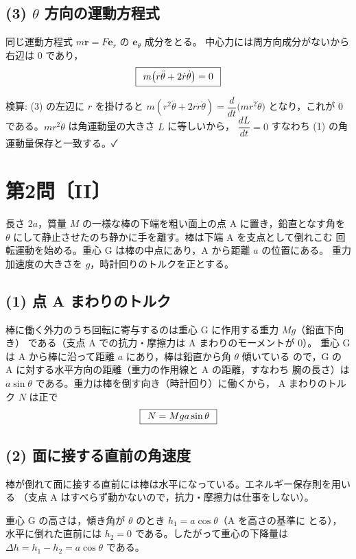 \documentclass[11pt,a4paper]{article}
\begin{document}
\subsection*{(3) $\theta$ 方向の運動方程式}
同じ運動方程式 $m\ddot{\bm{r}}=F\bm{e}_r$ の $\bm{e}_\theta$ 成分をとる。
中心力には周方向成分がないから右辺は $0$ であり，
\[
  \boxed{\,\;m\bigl(r\ddot\theta + 2\dot r\dot\theta\bigr)=0\;\,}
\]

\medskip
検算: (3) の左辺に $r$ を掛けると
$m(r^2\ddot\theta+2r\dot r\dot\theta)=\dfrac{d}{dt}\bigl(mr^2\dot\theta\bigr)$
となり，これが $0$ である。$mr^2\dot\theta$ は角運動量の大きさ $L$ に等しいから，
$\dfrac{dL}{dt}=0$ すなわち (1) の角運動量保存と一致する。✓

\clearpage
\section*{第2問〔II〕}

長さ $2a$，質量 $M$ の一様な棒の下端を粗い面上の点 A に置き，鉛直となす角を
$\theta$ にして静止させたのち静かに手を離す。棒は下端 A を支点として倒れこむ
回転運動を始める。重心 G は棒の中点にあり，A から距離 $a$ の位置にある。
重力加速度の大きさを $g$，時計回りのトルクを正とする。

\subsection*{(1) 点 A まわりのトルク}
棒に働く外力のうち回転に寄与するのは重心 G に作用する重力 $Mg$（鉛直下向き）
である（支点 A での抗力・摩擦力は A まわりのモーメントが $0$）。
重心 G は A から棒に沿って距離 $a$ にあり，棒は鉛直から角 $\theta$ 傾いている
ので，G の A に対する水平方向の距離（重力の作用線と A の距離，すなわち
腕の長さ）は $a\sin\theta$ である。重力は棒を倒す向き（時計回り）に働くから，
A まわりのトルク $N$ は正で
\[
  \boxed{\,\;N = Mga\sin\theta\;\,}
\]

\subsection*{(2) 面に接する直前の角速度}
棒が倒れて面に接する直前には棒は水平になっている。エネルギー保存則を用いる
（支点 A はすべらず動かないので，抗力・摩擦力は仕事をしない）。

重心 G の高さは，傾き角が $\theta$ のとき $h_1=a\cos\theta$（A を高さの基準に
とる），水平に倒れた直前には $h_2=0$ である。したがって重心の下降量は
$\Delta h = h_1-h_2 = a\cos\theta$ である。
\end{document}
